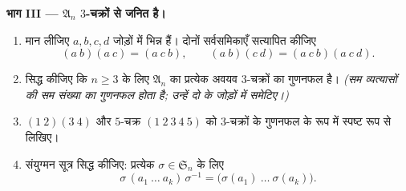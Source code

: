 \begin{problem}
\medskip \noindent\textbf{भाग III --- $\mathfrak A_n$ $3$-चक्रों से जनित
है।}
\begin{enumerate}[resume]
  \item मान लीजिए $a, b, c, d$ जोड़ों में भिन्न हैं। दोनों सर्वसमिकाएँ
  सत्यापित कीजिए
        \[
        (a\ b)(a\ c) = (a\ c\ b),
        \qquad
        (a\ b)(c\ d) = (a\ c\ b)(a\ c\ d) .
        \]
  \item सिद्ध कीजिए कि $n \geq 3$ के लिए $\mathfrak A_n$ का प्रत्येक अवयव
  $3$-चक्रों का गुणनफल है। \emph{(सम  व्यत्यासों की सम संख्या का
  गुणनफल होता है; उन्हें दो के जोड़ों में समेटिए।)}
  \item $(1\ 2)(3\ 4)$ और $5$-चक्र $(1\ 2\ 3\ 4\ 5)$ को $3$-चक्रों के गुणनफल
  के रूप में स्पष्ट रूप से लिखिए।
  \item संयुग्मन सूत्र सिद्ध कीजिए: प्रत्येक $\sigma \in \mathfrak S_n$ के
  लिए
        \[
        \sigma\,(a_1\ \dots\ a_k)\,\sigma^{-1}
        = \bigl(\sigma(a_1)\ \dots\ \sigma(a_k)\bigr) .
        \]
\end{enumerate}


\end{problem}

